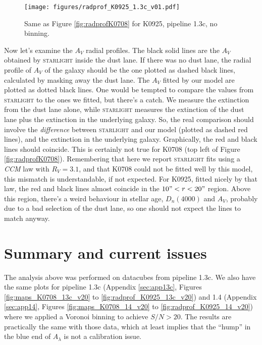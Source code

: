 \documentclass[a4paper]{article}
\def\starlight{\textsc{starlight}\xspace}
\def\CCM{\textit{CCM}\xspace}
\begin{document}
\begin{figure}
\texttt{[image: figures/radprof\_K0925\_1.3c\_v01.pdf]}

\caption{Same as Figure \ref{fig:radprofK0708} for K0925, pipeline 1.3c, no
binning.}
\label{fig:radprofK0925}
\end{figure}

Now let's examine the $A_V$ radial profiles. The black solid lines are the $A_V$
obtained by \starlight inside the dust lane. If there was no dust lane, the
radial profile of $A_V$ of the galaxy should be the one plotted as dashed black
lines, calculated by masking away the dust lane. The $A_V$ fitted by our model
are plotted as dotted black lines. One would be tempted to compare the values
from \starlight to the ones we fitted, but there's a catch. We measure the
extinction from the dust lane alone, while \starlight measures the extinction of
the dust lane plus the extinction in the underlying galaxy. So, the real
comparison should involve the {\em difference} between \starlight and our model
(plotted as dashed red lines), and the extinction in the underlying galaxy.
Graphically, the red and black lines should coincide. This is certainly not true
for K0708 (top left of Figure \ref{fig:radprofK0708}). Remembering that here we
report \starlight fits using a \CCM law with $R_V = 3.1$, and that K0708 could not be fitted well by this
model, this mismatch is understandable, if not expected. For K0925, fitted
nicely by that law, the red and black lines almost coincide in the $10" < r <
20"$ region. Above this region, there's a weird behaviour in stellar age,
$D_n(4000)$ and $A_V$, probably due to a bad selection of the dust lane, so one
should not expect the lines to match anyway.


\section{Summary and current issues}

The analysis above was performed on datacubes from pipeline 1.3c. We also have
the same plots for pipeline 1.3c (Appendix \ref{sec:app13c}, Figures
\ref{fig:maps_K0708_13c_v20} to \ref{fig:radprof_K0925_13c_v20}) and 1.4
(Appendix \ref{sec:app14}, Figures \ref{fig:maps_K0708_14_v20} to
\ref{fig:radprof_K0925_14_v20}) where we applied a Voronoi binning to achieve
$S/N > 20$. The results are practically the same with those data, which at least
implies that the ``hump'' in the blue end of $A_\lambda$ is not a calibration
issue.
\end{document}
